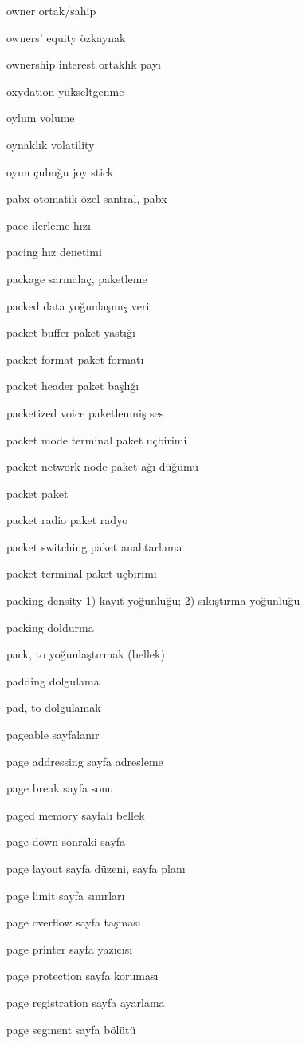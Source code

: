 \documentclass[12pt,fleqn]{article}\usepackage{../../common}
\begin{document}
owner ortak/sahip

owners' equity özkaynak

ownership interest ortaklık payı

oxydation yükseltgenme

oylum volume

oynaklık volatility

oyun çubuğu joy stick

pabx otomatik özel santral, pabx

pace ilerleme hızı

pacing hız denetimi

package sarmalaç, paketleme

packed data yoğunlaşmış veri

packet buffer paket yastığı

packet format paket formatı

packet header paket başlığı

packetized voice paketlenmiş ses

packet mode terminal paket uçbirimi

packet network node paket ağı düğümü

packet paket

packet radio paket radyo

packet switching paket anahtarlama

packet terminal paket uçbirimi

packing density 1) kayıt yoğunluğu; 2) sıkıştırma yoğunluğu

packing doldurma

pack, to yoğunlaştırmak (bellek)

padding dolgulama

pad, to dolgulamak

pageable sayfalanır

page addressing sayfa adresleme

page break sayfa sonu

paged memory sayfalı bellek

page down sonraki sayfa

page layout sayfa düzeni, sayfa planı

page limit sayfa sınırları

page overflow sayfa taşması

page printer sayfa yazıcısı

page protection sayfa koruması

page registration sayfa ayarlama

page segment sayfa bölütü
\end{document}
